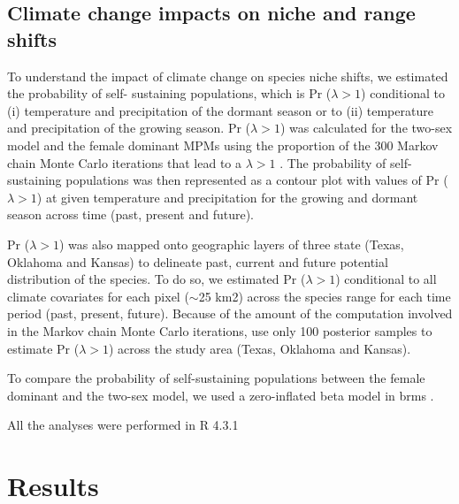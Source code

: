 \documentclass[12pt]{article}
\newcommand{\tom}[2]{{\color{red}{#1}}\footnote{\textit{\color{red}{#2}}}}
\begin{document}
\subsection*{Climate change impacts on niche and range shifts}
To understand the impact of climate change on species niche shifts, we estimated the probability of self- sustaining populations, which is Pr ($\lambda > 1$) conditional to (i) temperature and precipitation of the dormant season or to (ii) temperature and precipitation of the growing season.
Pr ($\lambda > 1$) was calculated for the two-sex model and the female dominant MPMs using the proportion of the 300 Markov chain Monte Carlo iterations that lead to a $\lambda > 1$ \citep{diez2014probabilistic}.
The probability of self- sustaining populations was then represented as a contour plot with values of Pr ($\lambda > 1$) at given temperature and precipitation for the growing and dormant season across time (past, present and future). 

Pr ($\lambda > 1$) was also mapped onto geographic layers of three state (Texas, Oklahoma and Kansas) to delineate past, current and future potential distribution of the species.
To do so, we estimated Pr ($\lambda > 1$) conditional to all climate covariates for each pixel ($\sim$25 km2) across the species range for each time period (past, present, future).
Because of the amount of the computation involved in the Markov chain Monte Carlo iterations, use only 100 posterior samples to estimate Pr ($\lambda > 1$) across the study area (Texas, Oklahoma and Kansas).

To compare the probability of self-sustaining populations between the female dominant and the two-sex model, we used a zero-inflated beta model in brms \citep{brms}. 

All the analyses were performed in R 4.3.1 \citep{RCoreteam}

\section*{Results}
\end{document}
